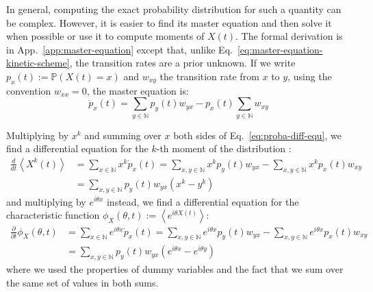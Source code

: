     In general, computing the exact probability distribution for such a quantity can be complex. However, it is easier to find its master equation and then solve it when possible or use it to compute moments of $X(t)$. The formal derivation is in App.~\ref{app:master-equation} except that, unlike Eq.~\eqref{eq:master-equation-kinetic-scheme}, the transition rates are a prior unknown. If we write $p_x(t):=\mathbb{P}(X(t)=x)$ and $w_{xy}$ the transition rate from $x$ to $y$, using the convention $w_{xx}=0$, the master equation is:
    \begin{equation}
    \label{eq:proba-diff-equ}
        \dot{p}_x(t) = \sum_{y\in\mathbb{N}} p_y(t)w_{yx} - p_x(t)\sum_{y\in\mathbb{N}} w_{xy}
    \end{equation}
    
    Multiplying by $x^k$ and summing over $x$ both sides of Eq.~\eqref{eq:proba-diff-equ}, we find a differential equation for the $k$-th moment of the distribution :
    \begin{equation}
    \label{eq:moment-diff-eq}
    \begin{split}
        \frac{d}{dt}\left\langle X^k(t) \right\rangle 
        &= \sum_{x\in\mathbb{N}} x^k\dot{p}_x(t)
        = \sum_{x,y\in\mathbb{N}} x^k p_y(t) w_{yx} - \sum_{x,y\in\mathbb{N}} x^k p_x(t) w_{xy} \\
        &= \sum_{x,y\in\mathbb{N}} p_y(t) w_{yx} \left(x^k - y^k\right)
    \end{split}
    \end{equation}
    and multiplying by $e^{i\theta x}$ instead, we find a differential equation for the characteristic function $\phi_X(\theta, t):=\left\langle e^{i\theta X(t)}\right\rangle$:
    \begin{equation}
    \label{eq:char-diff-eq}
    \begin{split}
        \frac{\partial}{\partial t}\phi_X(\theta, t) 
        &= \sum_{x\in\mathbb{N}} e^{i\theta x}\dot{p}_x(t)
        = \sum_{x,y\in\mathbb{N}} e^{i\theta x} p_y(t) w_{yx} - \sum_{x,y\in\mathbb{N}} e^{i\theta x} p_x(t) w_{xy} \\
        &= \sum_{x,y\in\mathbb{N}} p_y(t) w_{yx} \left(e^{i\theta x} - e^{i\theta y}\right)
    \end{split}
    \end{equation}
    where we used the properties of dummy variables and the fact that we sum over the same set of values in both sums.
    
